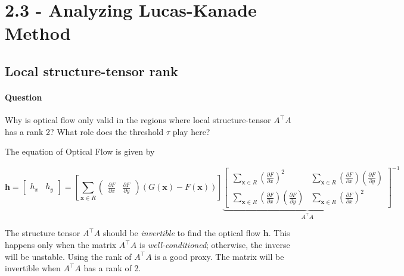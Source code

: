 \section{2.3 - Analyzing Lucas-Kanade Method}

\subsection{Local structure-tensor rank}

\paragraph*{Question}
\begin{displayquote}
    Why is optical flow only valid in the regions where local structure-tensor $A^\top A$ has a rank 2? What role does the threshold $\tau$ play here?
\end{displayquote}

The equation of Optical Flow is given by

\begin{equation*}
    \mathbf{h} = \begin{bmatrix} h_x & h_y \end{bmatrix} = \left [ \sum_{\mathbf{x} \in R} \begin{pmatrix}
        \frac{\partial F}{\partial x} & \frac{\partial F}{\partial y}
        \end{pmatrix} \left( G(\mathbf{x}) - F(\mathbf{x}) \right ) \right ] {\underbrace{\begin{bmatrix}
        \sum_{\mathbf{x} \in R} \left ( \frac{\partial F}{\partial x} \right )^2 &
        \sum_{\mathbf{x} \in R} \left ( \frac{\partial F}{\partial x} \right ) \left ( \frac{\partial F}{\partial y} \right ) \\
        \sum_{\mathbf{x} \in R} \left ( \frac{\partial F}{\partial x} \right ) \left ( \frac{\partial F}{\partial y} \right ) &
        \sum_{\mathbf{x} \in R} \left ( \frac{\partial F}{\partial x} \right )^2
        \end{bmatrix}}_{A^\top A}}^{-1}
\end{equation*}

The structure tensor $A^\top A$ should be \emph{invertible} to find the optical flow $\mathbf{h}$. This happens only when the matrix $A^\top A$ is \emph{well-conditioned}; otherwise, the inverse will be unstable. Using the rank of $A^\top A$ is a good proxy. The matrix will be invertible when $A^\top A$ has a rank of 2.

